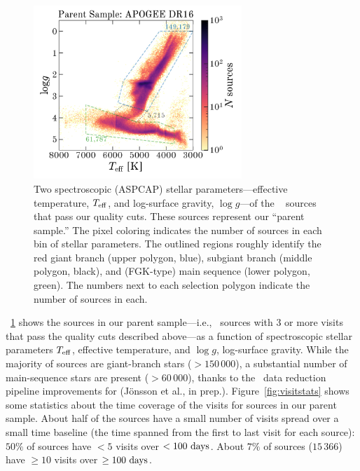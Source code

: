 \documentclass[modern]{aastex63}
\begin{document}
\begin{figure}[!t]
\begin{center}
\includegraphics[width=0.7\textwidth]{specHR.pdf}
\end{center}
\caption{%
Two spectroscopic (ASPCAP) stellar parameters---effective temperature, $T_{\rm
eff}$, and log-surface gravity, $\log g$---of the \apogee\  sources that
pass our quality cuts.
These sources represent our ``parent sample.''
The pixel coloring indicates the number of sources in each bin of stellar
parameters.
The outlined regions roughly identify the red giant branch (upper polygon,
blue), subgiant branch (middle polygon, black), and (FGK-type) main sequence
(lower polygon, green).
The numbers next to each selection polygon indicate the number of sources in
each.
\label{fig:specHR}
}
\end{figure}

\figurename~\ref{fig:specHR} shows the sources in our parent sample---i.e.,
\apogee\ sources with 3 or more visits that pass the quality cuts described
above---as a function of spectroscopic stellar parameters $T_{\rm eff}$,
effective temperature, and $\log g$, log-surface gravity.
While the majority of sources are giant-branch stars ($>150\,000$), a
substantial number of main-sequence stars are present ($>60\,000$), thanks to
the \apogee\ data reduction pipeline improvements for  (J\"onsson et al.,
in prep.).
Figure~\ref{fig:visitstats} shows some statistics about the time coverage of the
visits for sources in our parent sample.
About half of the sources have a small number of visits spread over a small time
baseline (the time spanned from the first to last visit for each source): $50\%$
of sources have $<5$ visits over $<100~{\rm days}$.
About $7\%$ of sources ($15\,366$) have $\geq 10$ visits over $\geq 100~{\rm
days}$.
\end{document}
